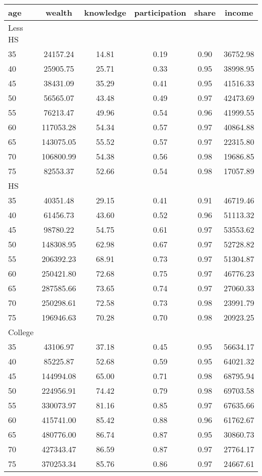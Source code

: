  \begin{tabular}{lccccc}
 \hline \hline
  age & wealth & knowledge & participation & share & income \\
 \hline
 Less HS & & & & & \\
 \hline
35 &  24157.24 &     14.81 &      0.19 &      0.90 &  36752.98 \\ 
40 &  25905.75 &     25.71 &      0.33 &      0.95 &  38998.95 \\ 
45 &  38431.09 &     35.29 &      0.41 &      0.95 &  41516.33 \\ 
50 &  56565.07 &     43.48 &      0.49 &      0.97 &  42473.69 \\ 
55 &  76213.47 &     49.96 &      0.54 &      0.96 &  41999.55 \\ 
60 & 117053.28 &     54.34 &      0.57 &      0.97 &  40864.88 \\ 
65 & 143075.05 &     55.52 &      0.57 &      0.97 &  22315.80 \\ 
70 & 106800.99 &     54.38 &      0.56 &      0.98 &  19686.85 \\ 
75 &  82553.37 &     52.66 &      0.54 &      0.98 &  17057.89 \\ 
 \hline
 HS & & & & & \\
 \hline
35 &  40351.48 &     29.15 &      0.41 &      0.91 &  46719.46 \\ 
40 &  61456.73 &     43.60 &      0.52 &      0.96 &  51113.32 \\ 
45 &  98780.22 &     54.75 &      0.61 &      0.97 &  53553.62 \\ 
50 & 148308.95 &     62.98 &      0.67 &      0.97 &  52728.82 \\ 
55 & 206392.23 &     68.91 &      0.73 &      0.97 &  51304.87 \\ 
60 & 250421.80 &     72.68 &      0.75 &      0.97 &  46776.23 \\ 
65 & 287585.66 &     73.65 &      0.74 &      0.97 &  27060.33 \\ 
70 & 250298.61 &     72.58 &      0.73 &      0.98 &  23991.79 \\ 
75 & 196946.63 &     70.28 &      0.70 &      0.98 &  20923.25 \\ 
 \hline
 College & & & & & \\
 \hline
35 &  43106.97 &     37.18 &      0.45 &      0.95 &  56634.17 \\ 
40 &  85225.87 &     52.68 &      0.59 &      0.95 &  64021.32 \\ 
45 & 144994.08 &     65.00 &      0.71 &      0.98 &  68795.94 \\ 
50 & 224956.91 &     74.42 &      0.79 &      0.98 &  69703.58 \\ 
55 & 330073.97 &     81.16 &      0.85 &      0.97 &  67635.66 \\ 
60 & 415741.00 &     85.42 &      0.88 &      0.96 &  61762.67 \\ 
65 & 480776.00 &     86.74 &      0.87 &      0.95 &  30860.73 \\ 
70 & 427343.47 &     86.59 &      0.87 &      0.97 &  27764.17 \\ 
75 & 370253.34 &     85.76 &      0.86 &      0.97 &  24667.61 \\ 
 \hline \hline
 \end{tabular}
